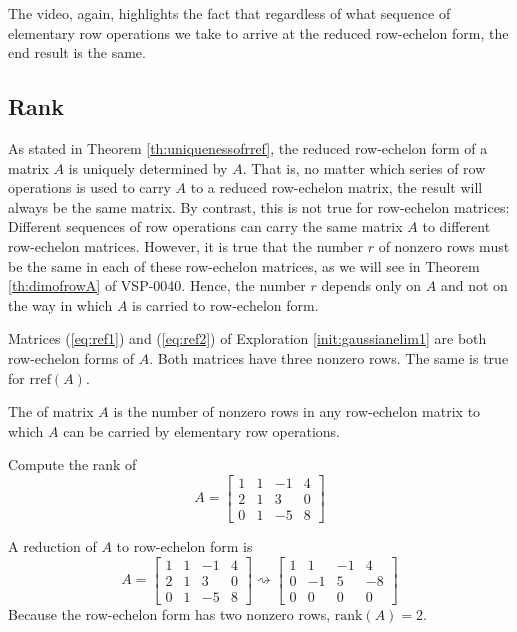 \documentclass{ximera}
\begin{document}

The video, again, highlights the fact that regardless of what sequence of elementary row operations we take to arrive at the reduced row-echelon form, the end result is the same.  



\subsection*{Rank}

As stated in Theorem \ref{th:uniquenessofrref}, the reduced row-echelon form of a matrix $A$ is uniquely determined by $A$. That is, no matter which series of row operations is used to carry $A$ to a reduced row-echelon matrix, the result will always be the same matrix. By contrast, this is not true for row-echelon matrices: Different sequences of row operations can carry the same matrix $A$ to different row-echelon matrices. However, it is true that the number $r$ of nonzero rows must be the same in each of these row-echelon matrices, as we will see in Theorem \ref{th:dimofrowA} of VSP-0040. Hence, the number $r$ depends only on $A$ and not on the way in which $A$ is carried to row-echelon form.  

\begin{example}\label{ex:rowechofA}
Matrices (\ref{eq:ref1}) and (\ref{eq:ref2}) of Exploration \ref{init:gaussianelim1} are both row-echelon forms of $A$.  Both matrices have three nonzero rows.  The same is true for $\mbox{rref}(A)$.  
\end{example}

\begin{definition}\label{def:rankofamatrix}
The  of matrix $A$ is the number of nonzero rows in any row-echelon matrix to which $A$ can be carried by elementary row operations.
\end{definition}

\begin{example}\label{ex:rankofA1}
Compute the rank of 
$$A =  
\begin{bmatrix}
	1 & 1 & -1 & 4 \\
	2 & 1 &  3 & 0 \\
	0 & 1 & -5 & 8
\end{bmatrix}$$

\begin{explanation}
A reduction of $A$ to row-echelon form is
$$
A =  
\begin{bmatrix}
1 & 1 & -1 & 4 \\
2 & 1 &  3 & 0 \\
0 & 1 & -5 & 8
\end{bmatrix} \rightsquigarrow\begin{bmatrix}
1 & 1 & -1 & 4 \\
0 & -1 &  5 & -8 \\
0 &  0 & 0 & 0
\end{bmatrix} 
$$
Because the row-echelon form has two nonzero rows, $\mbox{rank}(A) = 2$.
\end{explanation}
\end{example}
\end{document}
